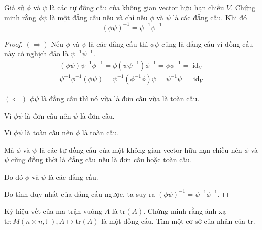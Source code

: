 \begin{exercise}
    Giả sử $\phi$ và $\psi$ là các tự đồng cấu của không gian vector hữu hạn chiều $V$. Chứng minh rằng $\phi\psi$ là một đẳng cấu nếu và chỉ nếu $\phi$ và $\psi$ là các đẳng cấu. Khi đó
    \[
        {(\phi\psi)}^{-1} = \psi^{-1}\psi^{-1}
    \]
\end{exercise}

\begin{proof}
    $(\Rightarrow)$ Nếu $\phi$ và $\psi$ là các đẳng cấu thì $\phi\psi$ cũng là đẳng cấu vì đồng cấu này có nghịch đảo là $\psi^{-1}\psi^{-1}$.
    \[
        \begin{split}
            (\phi\psi)\psi^{-1}\phi^{-1} = \phi(\psi\psi^{-1})\phi^{-1} = \phi\phi^{-1} = \operatorname{id}_{V} \\
            \psi^{-1}\phi^{-1}(\phi\psi) = \psi^{-1}(\phi^{-1}\phi)\psi = \psi^{-1}\psi = \operatorname{id}_{V}
        \end{split}
    \]
    
    $(\Leftarrow)$ $\phi\psi$ là đẳng cấu thì nó vừa là đơn cấu vừa là toàn cấu.
    
    Vì $\phi\psi$ là đơn cấu nên $\psi$ là đơn cấu.
    
    Vì $\phi\psi$ là toàn cấu nên $\phi$ là toàn cấu.
    
    Mà $\phi$ và $\psi$ là các tự đồng cấu của một không gian vector hữu hạn chiều nên $\phi$ và $\psi$ cũng đồng thời là đẳng cấu nếu là đơn cấu hoặc toàn cấu.
    
    Do đó $\phi$ và $\psi$ là các đẳng cấu.

    \bigskip

    Do tính duy nhất của đẳng cấu ngược, ta suy ra ${(\phi\psi)}^{-1} = \psi^{-1}\phi^{-1}$.
\end{proof}

\begin{exercise}
    Ký hiệu vết của ma trận vuông $A$ là $\text{tr}(A)$. Chứng minh rằng ánh xạ $\text{tr}: M(n\times n, \mathbb{F}), A\mapsto \text{tr}(A)$ là một đồng cấu. Tìm một cơ sở của nhân của $\text{tr}$.
\end{exercise}


